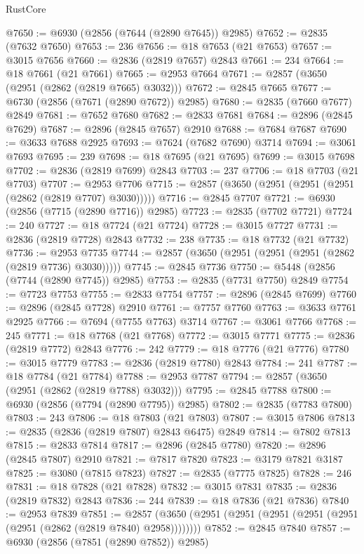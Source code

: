 \begin{lexlean}{RustCore}
\begin{coremodule}
@7650 := @6930 (@2856 (@7644 (@2890 @7645)) @2985)
@7652 := @2835 (@7632 @7650)
@7653 := 236
@7656 := @18 @7653 (@21 @7653)
@7657 := @3015 @7656
@7660 := @2836 (@2819 @7657) @2843
@7661 := 234
@7664 := @18 @7661 (@21 @7661)
@7665 := @2953 @7664
@7671 := @2857 (@3650 (@2951 (@2862 (@2819 @7665) @3032)))
@7672 := @2845 @7665
@7677 := @6730 (@2856 (@7671 (@2890 @7672)) @2985)
@7680 := @2835 (@7660 @7677) @2849
@7681 := @7652 @7680
@7682 := @2833 @7681
@7684 := @2896 (@2845 @7629)
@7687 := @2896 (@2845 @7657) @2910
@7688 := @7684 @7687
@7690 := @3633 @7688 @2925
@7693 := @7624 (@7682 @7690) @3714
@7694 := @3061 @7693
@7695 := 239
@7698 := @18 @7695 (@21 @7695)
@7699 := @3015 @7698
@7702 := @2836 (@2819 @7699) @2843
@7703 := 237
@7706 := @18 @7703 (@21 @7703)
@7707 := @2953 @7706
@7715 := @2857 (@3650 (@2951 (@2951 (@2951 (@2862 (@2819 @7707) @3030)))))
@7716 := @2845 @7707
@7721 := @6930 (@2856 (@7715 (@2890 @7716)) @2985)
@7723 := @2835 (@7702 @7721)
@7724 := 240
@7727 := @18 @7724 (@21 @7724)
@7728 := @3015 @7727
@7731 := @2836 (@2819 @7728) @2843
@7732 := 238
@7735 := @18 @7732 (@21 @7732)
@7736 := @2953 @7735
@7744 := @2857 (@3650 (@2951 (@2951 (@2951 (@2862 (@2819 @7736) @3030)))))
@7745 := @2845 @7736
@7750 := @5448 (@2856 (@7744 (@2890 @7745)) @2985)
@7753 := @2835 (@7731 @7750) @2849
@7754 := @7723 @7753
@7755 := @2833 @7754
@7757 := @2896 (@2845 @7699)
@7760 := @2896 (@2845 @7728) @2910
@7761 := @7757 @7760
@7763 := @3633 @7761 @2925
@7766 := @7694 (@7755 @7763) @3714
@7767 := @3061 @7766
@7768 := 245
@7771 := @18 @7768 (@21 @7768)
@7772 := @3015 @7771
@7775 := @2836 (@2819 @7772) @2843
@7776 := 242
@7779 := @18 @7776 (@21 @7776)
@7780 := @3015 @7779
@7783 := @2836 (@2819 @7780) @2843
@7784 := 241
@7787 := @18 @7784 (@21 @7784)
@7788 := @2953 @7787
@7794 := @2857 (@3650 (@2951 (@2862 (@2819 @7788) @3032)))
@7795 := @2845 @7788
@7800 := @6930 (@2856 (@7794 (@2890 @7795)) @2985)
@7802 := @2835 (@7783 @7800)
@7803 := 243
@7806 := @18 @7803 (@21 @7803)
@7807 := @3015 @7806
@7813 := @2835 (@2836 (@2819 @7807) @2843 @6475) @2849
@7814 := @7802 @7813
@7815 := @2833 @7814
@7817 := @2896 (@2845 @7780)
@7820 := @2896 (@2845 @7807) @2910
@7821 := @7817 @7820
@7823 := @3179 @7821 @3187
@7825 := @3080 (@7815 @7823)
@7827 := @2835 (@7775 @7825)
@7828 := 246
@7831 := @18 @7828 (@21 @7828)
@7832 := @3015 @7831
@7835 := @2836 (@2819 @7832) @2843
@7836 := 244
@7839 := @18 @7836 (@21 @7836)
@7840 := @2953 @7839
@7851 := @2857 (@3650 (@2951 (@2951 (@2951 (@2951 (@2951 (@2951 (@2862 (@2819 @7840) @2958))))))))
@7852 := @2845 @7840
@7857 := @6930 (@2856 (@7851 (@2890 @7852)) @2985)

\end{coremodule}
\end{lexlean}
